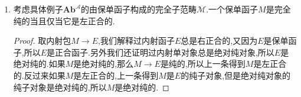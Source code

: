 \begin{enumerate}
\begin{proof}
		设$0\to M\to E\to F\to0$是$\textbf{Ab}^{\mathscr{A}}$的短正合列,其中$E$是左正合的.再取左正合列$0\to A'\to A\to A''$,那么有如下交换图表:
		$$\xymatrix{&0\ar[d]&0\ar[d]&0\ar[d]\\0\ar[r]&MA'\ar[r]\ar[d]&MA\ar[r]\ar[d]&MA''\ar[d]\\0\ar[r]&EA'\ar[r]\ar[d]&EA\ar[r]\ar[d]&EA''\\0\ar[r]&FA'\ar[r]\ar[d]&FA\ar[d]&\\&0&0&}$$
		
		这里列都是正合列,因为$M,E,F$构成正合列,第二行是正合列因为$E$是左正合的.在这个条件下第一行是正合的当且仅当第三行是正合的.于是$M$是左正合的当且仅当$FA'\to FA$是单态射,当且仅当$F$是保单函子,也即$M$是纯的.
	\end{proof}
	\item 考虑具体例子$\textbf{Ab}^{\mathscr{A}}$的由保单函子构成的完全子范畴$\mathscr{M}$.一个保单函子$M$是完全纯的当且仅当它是左正合的.
	\begin{proof}
		
		取内射包$M\to E$,我们解释过内射函子$E$总是右正合的,又因为$E$是保单函子,所以$E$是正合函子.另外我们还证明过内射单对象总是绝对纯对象,所以$E$是绝对纯的.如果$M$是绝对纯的,那么$M\to E$是纯的,所以上一条得到$M$是左正合的.反过来如果$M$是左正合的,上一条得到$M$是$E$的纯子对象,但是绝对纯对象的纯子对象是绝对纯的,所以$M$是绝对纯的.
	\end{proof}
\end{enumerate}

